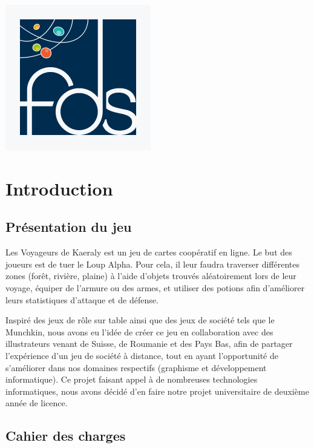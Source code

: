\documentclass[12pt]{report}
\begin{document}
\begin{titlepage}
\begin{center}
			\vfill

			\includegraphics[scale=0.3]{logo-fds.jpg}~

		\end{center}
	\end{titlepage}

\tableofcontents

\chapter*{Introduction}

    \section*{Présentation du jeu}

    Les Voyageurs de Kaeraly est un jeu de cartes coopératif en ligne. Le but des joueurs est de tuer le Loup Alpha. Pour cela, il leur faudra traverser différentes zones (forêt, rivière, plaine) à l'aide d'objets trouvés aléatoirement lors de leur voyage, équiper de l'armure ou des armes, et utiliser des potions afin d'améliorer leurs statistiques d'attaque et de défense.


    Inspiré des jeux de rôle sur table ainsi que des jeux de société tels que le Munchkin, nous avons eu l'idée de créer ce jeu en collaboration avec des illustrateurs venant de Suisse, de Roumanie et des Pays Bas, afin de partager l'expérience d'un jeu de société à distance, tout en ayant l'opportunité de s'améliorer dans nos domaines respectifs (graphisme et développement informatique). Ce projet faisant appel à de nombreuses technologies informatiques, nous avons décidé d'en faire notre projet universitaire de deuxième année de licence.

    \section*{Cahier des charges}
\end{document}
